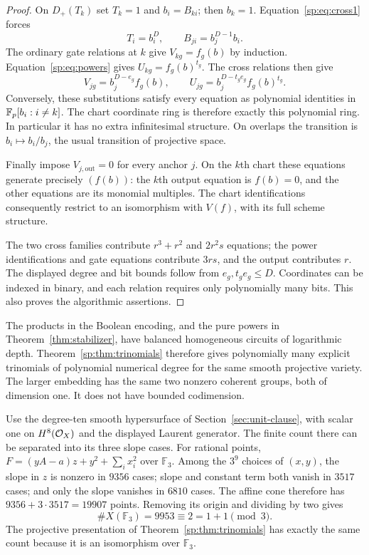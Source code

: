 \begin{proof}
On $D_+(T_k)$ set $T_k=1$ and $b_i=B_{ki}$; then $b_k=1$.
Equation~\eqref{sp:eq:cross1} forces
\[
 T_i=b_i^D,\qquad B_{ji}=b_j^{D-1}b_i.
\]
The ordinary gate relations at $k$ give $V_{kg}=f_g(b)$ by induction.
Equation~\eqref{sp:eq:powers} gives
$U_{kg}=f_g(b)^{t_g}$. The cross relations then give
\[
 V_{jg}=b_j^{D-e_g}f_g(b),\qquad
 U_{jg}=b_j^{D-t_ge_g}f_g(b)^{t_g}.
\]
Conversely, these substitutions satisfy every equation as polynomial
identities in $\mathbb F_p[b_i:i\ne k]$. The chart coordinate ring is therefore
exactly this polynomial ring. In particular it has no extra infinitesimal
structure. On overlaps the transition is $b_i\mapsto b_i/b_j$, the usual
transition of projective space.

Finally impose $V_{j,\mathrm{out}}=0$ for every anchor $j$.
On the $k$th chart these equations generate precisely $(f(b))$: the
$k$th output equation is $f(b)=0$, and the other equations are its
monomial multiples. The chart identifications consequently restrict to
an isomorphism with $V(f)$, with its full scheme structure.

The two cross families contribute $r^3+r^2$ and $2r^2s$ equations;
the power identifications and gate equations contribute $3rs$, and the
output contributes $r$. The displayed degree and bit bounds follow from
$e_g,t_g e_g\leq D$. Coordinates can be indexed in binary, and each
relation requires only polynomially many bits. This also proves the
algorithmic assertions.
\end{proof}

The products in the Boolean encoding, and the pure powers in
Theorem~\ref{thm:stabilizer}, have balanced homogeneous circuits of
logarithmic depth. Theorem~\ref{sp:thm:trinomials} therefore gives
polynomially many explicit trinomials of polynomial numerical degree for
the same smooth projective variety. The larger embedding has the same
two nonzero coherent groups, both of dimension one. It does not have
bounded codimension.

\begin{example}
\label{sp:ex:unit}
Use the degree-ten smooth hypersurface of Section~\ref{sec:unit-clause},
with scalar one on $H^8(\mathcal O_X)$ and the displayed Laurent generator.
The finite count there can be separated into its three slope cases.
For rational points, $F=(yA-a)z+y^2+\sum_i x_i^2$ over $\mathbb F_3$.
Among the $3^9$ choices of $(x,y)$, the slope in $z$ is nonzero in
$9356$ cases; slope and constant term both vanish in $3517$ cases;
and only the slope vanishes in $6810$ cases. The affine cone therefore
has $9356+3\cdot3517=19907$ points. Removing its origin and dividing
by two gives
\[
 \#X(\mathbb F_3)=9953\equiv2=1+1\pmod3.
\]
The projective presentation of Theorem~\ref{sp:thm:trinomials} has exactly
the same count because it is an isomorphism over $\mathbb F_3$.
\end{example}

